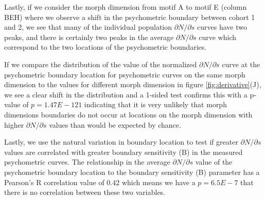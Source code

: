 Lastly, if we consider the morph dimension from motif A to motif E (column BEH) where we observe a shift in the psychometric boundary between cohort 1 and 2, we see that many of the individual population $\partial N / \partial s$ curves have two peaks, and there is certainly two peaks in the average $\partial N / \partial s$ curve which correspond to the two locations of the psychometric boundaries.

If we compare the distribution of the value of the normalized $\partial N / \partial s$ curve at the psychometric boundary location for psychometric curves on the same morph dimension to the values for different morph dimension in figure \ref{fig:derivative}(J), we see a clear shift in the distribution and a 1-sided \KS test confirms this with a p-value of $p=1.47E-121$ indicating that it is very unlikely that morph dimensions boundaries do not occur at locations on the morph dimension with higher $\partial N / \partial s$ values than would be expected by chance.

Lastly, we use the natural variation in boundary location to test if greater $\partial N / \partial s$ values are correlated with greater boundary sensitivity (B) in the measured psychometric curves. The relationship in the average $\partial N / \partial s$ value of the psychometric boundary location to the boundary sensitivity (B) parameter has a Pearson's R correlation value of 0.42 which means we have a $p=6.5E-7$ that there is no correlation between these two variables.